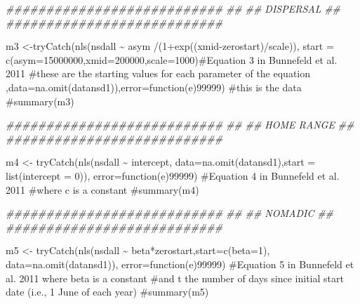 \documentclass[
  letterpaper,
]{book}
\newenvironment{Shaded}{\begin{snugshade}}{\end{snugshade}}
\newcommand{\AttributeTok}[1]{\textcolor[rgb]{0.40,0.45,0.13}{#1}}
\newcommand{\CommentTok}[1]{\textcolor[rgb]{0.37,0.37,0.37}{#1}}
\newcommand{\ControlFlowTok}[1]{\textcolor[rgb]{0.00,0.23,0.31}{#1}}
\newcommand{\DecValTok}[1]{\textcolor[rgb]{0.68,0.00,0.00}{#1}}
\newcommand{\DocumentationTok}[1]{\textcolor[rgb]{0.37,0.37,0.37}{\textit{#1}}}
\newcommand{\FunctionTok}[1]{\textcolor[rgb]{0.28,0.35,0.67}{#1}}
\newcommand{\NormalTok}[1]{\textcolor[rgb]{0.00,0.23,0.31}{#1}}
\newcommand{\OtherTok}[1]{\textcolor[rgb]{0.00,0.23,0.31}{#1}}
\newcommand{\SpecialCharTok}[1]{\textcolor[rgb]{0.37,0.37,0.37}{#1}}
\begin{document}
\begin{Shaded}
\begin{Highlighting}[]
\DocumentationTok{\#\#\#\#\#\#\#\#\#\#\#\#\#\#\#\#\#\#\#\#\#\#\#\#\#\#\#}
\DocumentationTok{\#\#}
\DocumentationTok{\#\#  DISPERSAL}
\DocumentationTok{\#\#}
\DocumentationTok{\#\#\#\#\#\#\#\#\#\#\#\#\#\#\#\#\#\#\#\#\#\#\#\#\#\#\#}

\NormalTok{m3 }\OtherTok{\textless{}{-}}\FunctionTok{tryCatch}\NormalTok{(}\FunctionTok{nls}\NormalTok{(nsdall }\SpecialCharTok{\textasciitilde{}}\NormalTok{  asym }\SpecialCharTok{/}\NormalTok{(}\DecValTok{1}\SpecialCharTok{+}\FunctionTok{exp}\NormalTok{((xmid}\SpecialCharTok{{-}}\NormalTok{zerostart)}\SpecialCharTok{/}\NormalTok{scale)),}
\AttributeTok{start =} \FunctionTok{c}\NormalTok{(}\AttributeTok{asym=}\DecValTok{15000000}\NormalTok{,}\AttributeTok{xmid=}\DecValTok{200000}\NormalTok{,}\AttributeTok{scale=}\DecValTok{1000}\NormalTok{)}\CommentTok{\#Equation 3 in Bunnefeld et al. 2011                  }
\CommentTok{\#these are the starting values for each parameter of the equation }
\NormalTok{,}\AttributeTok{data=}\FunctionTok{na.omit}\NormalTok{(datansd1)),}\AttributeTok{error=}\ControlFlowTok{function}\NormalTok{(e)}\DecValTok{99999}\NormalTok{)   }\CommentTok{\#this is the data}
\CommentTok{\#summary(m3)        }

\DocumentationTok{\#\#\#\#\#\#\#\#\#\#\#\#\#\#\#\#\#\#\#\#\#\#\#\#\#\#\#}
\DocumentationTok{\#\#}
\DocumentationTok{\#\# HOME RANGE}
\DocumentationTok{\#\#}
\DocumentationTok{\#\#\#\#\#\#\#\#\#\#\#\#\#\#\#\#\#\#\#\#\#\#\#\#\#\#\#}

\NormalTok{m4 }\OtherTok{\textless{}{-}} \FunctionTok{tryCatch}\NormalTok{(}\FunctionTok{nls}\NormalTok{(nsdall }\SpecialCharTok{\textasciitilde{}}\NormalTok{ intercept, }\AttributeTok{data=}\FunctionTok{na.omit}\NormalTok{(datansd1),}\AttributeTok{start =} \FunctionTok{list}\NormalTok{(}\AttributeTok{intercept =} \DecValTok{0}\NormalTok{)),}
  \AttributeTok{error=}\ControlFlowTok{function}\NormalTok{(e)}\DecValTok{99999}\NormalTok{) }\CommentTok{\#Equation 4 in Bunnefeld et al. 2011}
\CommentTok{\#where c is a constant}
\CommentTok{\#summary(m4)}

\DocumentationTok{\#\#\#\#\#\#\#\#\#\#\#\#\#\#\#\#\#\#\#\#\#\#\#\#\#\#\#}
\DocumentationTok{\#\#}
\DocumentationTok{\#\# NOMADIC}
\DocumentationTok{\#\#}
\DocumentationTok{\#\#\#\#\#\#\#\#\#\#\#\#\#\#\#\#\#\#\#\#\#\#\#\#\#\#\#}

\NormalTok{m5 }\OtherTok{\textless{}{-}} \FunctionTok{tryCatch}\NormalTok{(}\FunctionTok{nls}\NormalTok{(nsdall }\SpecialCharTok{\textasciitilde{}}\NormalTok{ beta}\SpecialCharTok{*}\NormalTok{zerostart,}\AttributeTok{start=}\FunctionTok{c}\NormalTok{(}\AttributeTok{beta=}\DecValTok{1}\NormalTok{), }\AttributeTok{data=}\FunctionTok{na.omit}\NormalTok{(datansd1)),}
  \AttributeTok{error=}\ControlFlowTok{function}\NormalTok{(e)}\DecValTok{99999}\NormalTok{) }\CommentTok{\#Equation 5 in Bunnefeld et al. 2011 where beta is a constant }
\CommentTok{\#and t the number of days since initial start date (i.e., 1 June of each year)}
\CommentTok{\#summary(m5)}


\end{Highlighting}
\end{Shaded}
\end{document}
